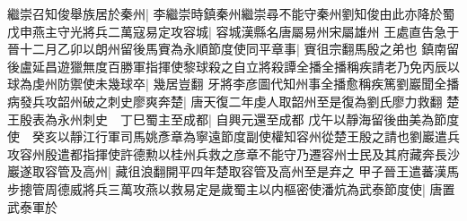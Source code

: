 繼崇召知俊舉族居於秦州|{
	李繼崇時鎮秦州繼崇尋不能守秦州劉知俊由此亦降於蜀}
戊申燕主守光將兵二萬寇易定攻容城|{
	容城漢縣名唐屬易州宋屬雄州}
王處直告急于晉十二月乙卯以朗州留後馬賨為永順節度使同平章事|{
	賨徂宗翻馬殷之弟也}
鎮南留後盧延昌遊獵無度百勝軍指揮使黎球殺之自立將殺譚全播全播稱疾請老乃免丙辰以球為虔州防禦使未幾球卒|{
	幾居豈翻}
牙將李彦圖代知州事全播愈稱疾篤劉巖聞全播病發兵攻韶州破之刺史廖爽奔楚|{
	唐天復二年虔人取韶州至是復為劉氏廖力救翻}
楚王殷表為永州刺史　丁巳蜀主至成都|{
	自興元還至成都}
戊午以靜海留後曲美為節度使　癸亥以靜江行軍司馬姚彥章為寧遠節度副使權知容州從楚王殷之請也劉巖遣兵攻容州殷遣都指揮使許德勲以桂州兵救之彦章不能守乃遷容州士民及其府藏奔長沙巖遂取容管及高州|{
	藏徂浪翻開平四年楚取容管及高州至是弃之}
甲子晉王遣蕃漢馬步摠管周德威將兵三萬攻燕以救易定是歲蜀主以内樞密使潘炕為武泰節度使|{
	唐置武泰軍於}


